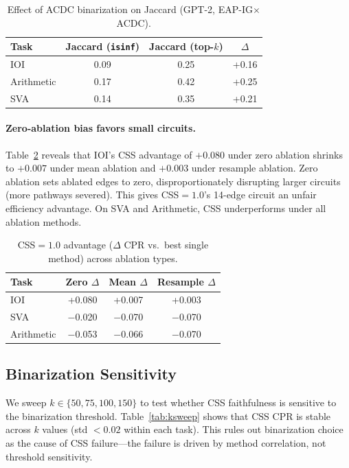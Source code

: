 \documentclass[11pt]{article}
\begin{document}
\begin{table}[h]
\centering
\caption{Effect of ACDC binarization on Jaccard (GPT-2, EAP-IG$\times$ACDC).}
\label{tab:binarization}
\begin{tabular}{lccc}
\toprule
Task & Jaccard (\texttt{isinf}) & Jaccard (top-$k$) & $\Delta$ \\
\midrule
IOI & 0.09 & 0.25 & +0.16 \\
Arithmetic & 0.17 & 0.42 & +0.25 \\
SVA & 0.14 & 0.35 & +0.21 \\
\bottomrule
\end{tabular}
\end{table}

\paragraph{Zero-ablation bias favors small circuits.} Table~\ref{tab:ablation} reveals that IOI's CSS advantage of $+0.080$ under zero ablation shrinks to $+0.007$ under mean ablation and $+0.003$ under resample ablation. Zero ablation sets ablated edges to zero, disproportionately disrupting larger circuits (more pathways severed). This gives CSS$=1.0$'s 14-edge circuit an unfair efficiency advantage. On SVA and Arithmetic, CSS underperforms under all ablation methods.

\begin{table}[h]
\centering
\caption{CSS$=1.0$ advantage ($\Delta$ CPR vs.\ best single method) across ablation types.}
\label{tab:ablation}
\begin{tabular}{lccc}
\toprule
Task & Zero $\Delta$ & Mean $\Delta$ & Resample $\Delta$ \\
\midrule
IOI & +0.080 & +0.007 & +0.003 \\
SVA & $-$0.020 & $-$0.070 & $-$0.070 \\
Arithmetic & $-$0.053 & $-$0.066 & $-$0.070 \\
\bottomrule
\end{tabular}
\end{table}

\subsection{Binarization Sensitivity}
\label{sec:binarization}

We sweep $k \in \{50, 75, 100, 150\}$ to test whether CSS faithfulness is sensitive to the binarization threshold. Table~\ref{tab:ksweep} shows that CSS CPR is stable across $k$ values (std $< 0.02$ within each task). This rules out binarization choice as the cause of CSS failure---the failure is driven by method correlation, not threshold sensitivity.
\end{document}
